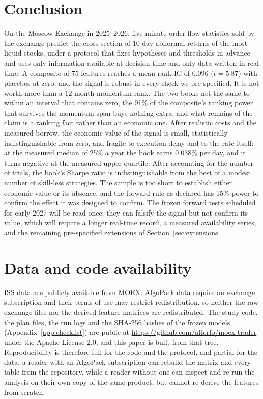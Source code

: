 \section{Conclusion}\label{sec:conclusion}

On the Moscow Exchange in 2025--2026, five-minute order-flow statistics sold by the exchange predict the cross-section of 10-day abnormal returns of the most liquid stocks, under a protocol that fixes hypotheses and thresholds in advance and uses only information available at decision time and only data written in real time. A composite of 75 features reaches a mean rank IC of 0.096 ($t=5.87$) with placebos at zero, and the signal is robust in every check we pre-specified. It is not worth more than a 12-month momentum rank. The two books net the same to within an interval that contains zero, the 91\% of the composite's ranking power that survives the momentum span buys nothing extra, and what remains of the claim is a ranking fact rather than an economic one. After realistic costs and the measured borrow, the economic value of the signal is small, statistically indistinguishable from zero, and fragile to execution delay and to the rate itself: at the measured median of 25\% a year the book earns 0.038\% per day, and it turns negative at the measured upper quartile. After accounting for the number of trials, the book's Sharpe ratio is indistinguishable from the best of a modest number of skill-less strategies. The sample is too short to establish either economic value or its absence, and the forward rule as declared has 15\% power to confirm the effect it was designed to confirm. The frozen forward tests scheduled for early 2027 will be read once; they can falsify the signal but not confirm its value, which will require a longer real-time record, a measured availability series, and the remaining pre-specified extensions of Section~\ref{sec:extensions}.

\section*{Data and code availability}

ISS data are publicly available from MOEX. AlgoPack data require an exchange subscription and their terms of use may restrict redistribution, so neither the raw exchange files nor the derived feature matrices are redistributed. The study code, the plan files, the run logs and the SHA-256 hashes of the frozen models (Appendix~\ref{app:checklist}) are public at \url{https://github.com/alterfo/moex-trader} under the Apache License 2.0, and this paper is built from that tree. Reproducibility is therefore full for the code and the protocol, and partial for the data: a reader with an AlgoPack subscription can rebuild the matrix and every table from the repository, while a reader without one can inspect and re-run the analysis on their own copy of the same product, but cannot re-derive the features from scratch.

